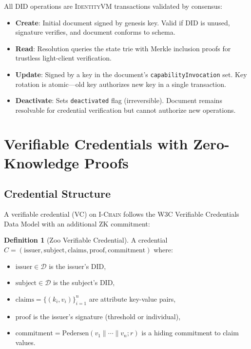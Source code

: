\documentclass[11pt,letterpaper]{article}
\theoremstyle{definition}
\newtheorem{definition}{Definition}
\theoremstyle{remark}
\newcommand{\IChain}{\textsc{I-Chain}}
\newcommand{\IdentityVM}{\textsc{IdentityVM}}
\begin{document}
All DID operations are \IdentityVM{} transactions validated by consensus:

\begin{itemize}
\item \textbf{Create}: Initial document signed by genesis key. Valid if DID is unused, signature verifies, and document conforms to schema.
\item \textbf{Read}: Resolution queries the state trie with Merkle inclusion proofs for trustless light-client verification.
\item \textbf{Update}: Signed by a key in the document's \texttt{capabilityInvocation} set. Key rotation is atomic---old key authorizes new key in a single transaction.
\item \textbf{Deactivate}: Sets \texttt{deactivated} flag (irreversible). Document remains resolvable for credential verification but cannot authorize new operations.
\end{itemize}

\section{Verifiable Credentials with Zero-Knowledge Proofs}

\subsection{Credential Structure}

A verifiable credential (VC) on \IChain{} follows the W3C Verifiable Credentials Data Model \cite{w3c-vc-data-model} with an additional ZK commitment:

\begin{definition}[Zoo Verifiable Credential]
A credential $C = (\text{issuer}, \text{subject}, \text{claims}, \text{proof}, \text{commitment})$ where:
\begin{itemize}
\item $\text{issuer} \in \mathcal{D}$ is the issuer's DID,
\item $\text{subject} \in \mathcal{D}$ is the subject's DID,
\item $\text{claims} = \{(k_i, v_i)\}_{i=1}^{n}$ are attribute key-value pairs,
\item $\text{proof}$ is the issuer's signature (threshold or individual),
\item $\text{commitment} = \text{Pedersen}(v_1 \| \cdots \| v_n; r)$ is a hiding commitment to claim values.
\end{itemize}
\end{definition}
\end{document}

